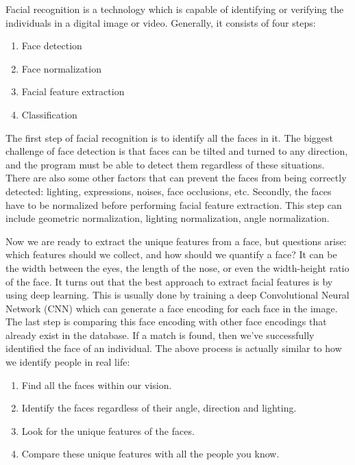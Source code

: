 Facial recognition is a technology which is capable of identifying or verifying the individuals in a digital image or video.
Generally, it consists of four steps:

\vspace{0.5cm}
\begin{enumerate}
  \item Face detection
  \item Face normalization
  \item Facial feature extraction
  \item Classification
\end{enumerate}
\setstretch{\myContentLineSpacing}

The first step of facial recognition is to identify all the faces in it. The biggest challenge of face detection
is that faces can be tilted and turned to any direction, and the program must be able to detect them regardless of
these situations. There are also some other factors that can prevent the faces from being correctly detected:
lighting, expressions, noises, face occlusions, etc. Secondly, the faces have to be normalized before performing
facial feature extraction. This step can include geometric normalization, lighting normalization, angle normalization.

Now we are ready to extract the unique features from a face, but questions arise: which features should we collect, and
how should we quantify a face? It can be the width between the eyes, the length of the nose, or even the width-height ratio
of the face. It turns out that the best approach to extract facial features is by using deep learning.
This is usually done by training a deep Convolutional Neural Network (CNN) which can generate a face encoding for each face
in the image. The last step is comparing this face encoding with other face encodings that already exist in the database.
If a match is found, then we've successfully identified the face of an individual. The above process is actually similar to
how we identify people in real life:

\vspace{0.5cm}
\begin{enumerate}
  \item Find all the faces within our vision.
  \item Identify the faces regardless of their angle, direction and lighting.
  \item Look for the unique features of the faces.
  \item Compare these unique features with all the people you know.
\end{enumerate}
\setstretch{\myContentLineSpacing}


